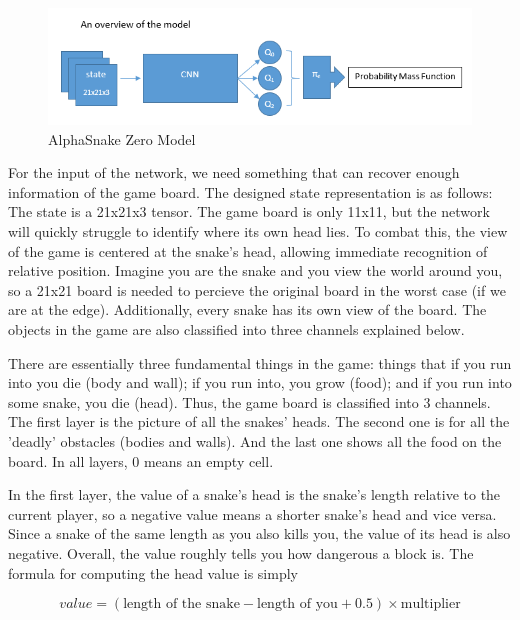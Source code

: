 \documentclass{article}
\begin{document}
\begin{figure}[!ht]
  \centering
  \includegraphics[width=\linewidth]{overview_of_model}
  \caption{AlphaSnake Zero Model}
  \label{fig:overview_of_model}
\end{figure}

\FloatBarrier

For the input of the network, we need something that can recover enough
information of the game board. The designed state representation is as
follows: The state is a 21x21x3 tensor. The game board is only 11x11, but the
network will quickly struggle to identify where its own head lies. To combat this,
the view of the game is centered at the snake's head, allowing immediate
recognition of relative position. Imagine you are the snake and you view the
world around you, so a 21x21 board is needed to percieve the original board in
the worst case (if we are at the edge). Additionally, every snake has
its own view of the board. The objects in the game are also classified into
three channels explained below.

There are essentially three fundamental things in the game: things that if you run into you
die (body and wall); if you run into, you grow (food); and if you run into
some snake, you die (head). Thus, the game board is classified into 3
channels. The first layer is the picture of all the snakes' heads. The second
one is for all the 'deadly' obstacles (bodies and walls). And the last one shows
all the food on the board. In all layers, 0 means an empty cell.

In the first layer, the value of a snake's head is the snake's length relative
to the current player, so a negative value means a shorter snake's head and vice
versa. Since a snake of the same length as you also kills you, the value of its
head is also negative. Overall, the value roughly tells you how dangerous a
block is. The formula for computing the head value is simply

\begin{equation}
  value = (\text{length of the snake}-\text{length of you}+0.5) \times \text{multiplier}
\end{equation}
\end{document}
